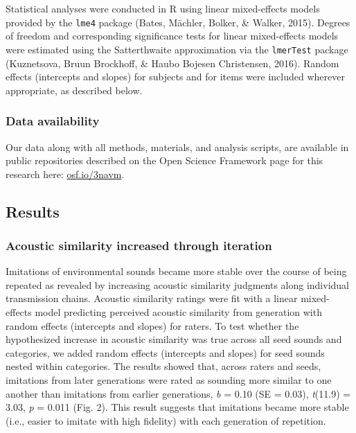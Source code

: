 \documentclass[english,floatsintext,man]{apa6}
\theoremstyle{definition}
\theoremstyle{definition}
\theoremstyle{definition}
\theoremstyle{remark}
\begin{document}
Statistical analyses were conducted in R using linear mixed-effects
models provided by the \texttt{lme4} package (Bates, Mächler, Bolker, \&
Walker, 2015). Degrees of freedom and corresponding significance tests
for linear mixed-effects models were estimated using the Satterthwaite
approximation via the \texttt{lmerTest} package (Kuznetsova, Bruun
Brockhoff, \& Haubo Bojesen Christensen, 2016). Random effects
(intercepts and slopes) for subjects and for items were included
wherever appropriate, as described below.

\hypertarget{data-availability}{%
\subsubsection{Data availability}\label{data-availability}}

Our data along with all methods, materials, and analysis scripts, are
available in public repositories described on the Open Science Framework
page for this research here: \href{https://osf.io/3navm}{osf.io/3navm}.

\hypertarget{results}{%
\subsection{Results}\label{results}}

\hypertarget{acoustic-similarity-increased-through-iteration}{%
\subsubsection{Acoustic similarity increased through
iteration}\label{acoustic-similarity-increased-through-iteration}}

Imitations of environmental sounds became more stable over the course of
being repeated as revealed by increasing acoustic similarity judgments
along individual transmission chains. Acoustic similarity ratings were
fit with a linear mixed-effects model predicting perceived acoustic
similarity from generation with random effects (intercepts and slopes)
for raters. To test whether the hypothesized increase in acoustic
similarity was true across all seed sounds and categories, we added
random effects (intercepts and slopes) for seed sounds nested within
categories. The results showed that, across raters and seeds, imitations
from later generations were rated as sounding more similar to one
another than imitations from earlier generations, \emph{b} = 0.10 (SE =
0.03), \emph{t}(11.9) = 3.03, \emph{p} = 0.011 (Fig. 2). This result
suggests that imitations became more stable (i.e., easier to imitate
with high fidelity) with each generation of repetition.
\end{document}
